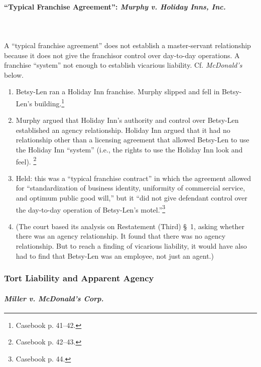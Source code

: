 \paragraph{``Typical Franchise Agreement'': \emph{Murphy v. Holiday Inns, 
Inc.}}
~\\\\
A ``typical franchise agreement'' does not establish a master-servant 
relationship because it does not give the franchisor control over day-to-day 
operations. A franchise ``system'' not enough to establish vicarious 
liability. Cf. \emph{McDonald's} below.

\begin{enumerate}
    \item Betsy-Len ran a Holiday Inn franchise. Murphy slipped and fell in Betsy-Len's 
    building.\footnote{Casebook p. 41--42.}
    \item Murphy argued that Holiday Inn's authority and control over 
    Betsy-Len established an agency relationship. Holiday Inn argued that it 
    had no relationship other than a licensing agreement that allowed 
    Betsy-Len to use the Holiday Inn ``system'' (i.e., the rights to use the 
    Holiday Inn look and feel).
    \footnote{Casebook p. 42--43.}
    \item Held: this was a ``typical franchise contract'' in which the 
    agreement allowed for ``standardization of business identity, uniformity 
    of commercial service, and optimum public good will,'' but it ``did not 
    give defendant control over the day-to-day operation of Betsy-Len's 
    motel.''\footnote{Casebook p. 44.}
    \item (The court based its analysis on Restatement (Third) \S\ 1, asking 
    whether there was an agency relationship. It found that there was no 
    agency relationship. But to reach a finding of vicarious liability, it 
    would have also had to find that Betsy-Len was an employee, not just an 
    agent.)
\end{enumerate}

\subsubsection{Tort Liability and Apparent Agency}

\paragraph{\emph{Miller v. McDonald's Corp.}}

